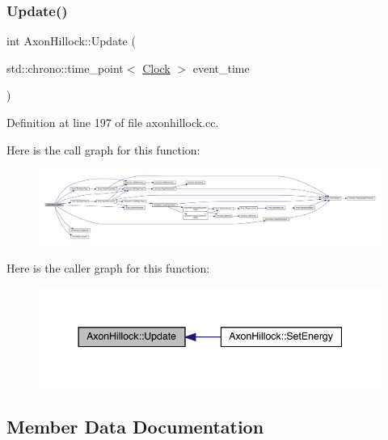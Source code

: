 \subsubsection{\texorpdfstring{Update()}{Update()}}
{\footnotesize\ttfamily int Axon\+Hillock\+::\+Update (\begin{DoxyParamCaption}\item[{std\+::chrono\+::time\+\_\+point$<$ \hyperlink{universe_8h_a0ef8d951d1ca5ab3cfaf7ab4c7a6fd80}{Clock} $>$}]{event\+\_\+time }\end{DoxyParamCaption})}



Definition at line 197 of file axonhillock.\+cc.

Here is the call graph for this function\+:
\nopagebreak
\begin{figure}[H]
\begin{center}
\leavevmode
\includegraphics[width=350pt]{class_axon_hillock_a5a6a6a93a98b32c303b9ee6320c09909_cgraph}
\end{center}
\end{figure}
Here is the caller graph for this function\+:
\nopagebreak
\begin{figure}[H]
\begin{center}
\leavevmode
\includegraphics[width=344pt]{class_axon_hillock_a5a6a6a93a98b32c303b9ee6320c09909_icgraph}
\end{center}
\end{figure}


\subsection{Member Data Documentation}
\mbox{\label{class_axon_hillock_a110d655ded8e09306b224b6e940cd60b}} 

